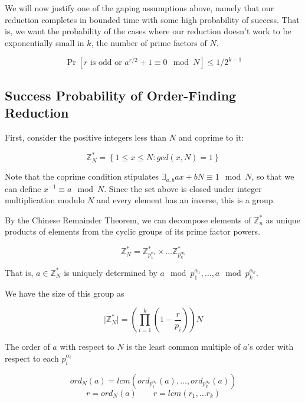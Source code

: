 \documentclass[12pt]{article}
\begin{document}
We will now justify one of the gaping assumptions above, namely that our
reduction completes in bounded time with some high probability of success.
That is, we want the probability of the cases where our reduction doesn't
work to be exponentially small in $k$, the number of prime factors of $N$.

\begin{displaymath}
\Pr\left[ r \text{ is odd or } a^{r/2} + 1 \equiv 0 \mod N \right] \le 1/2^{k-1}
\end{displaymath}

\subsection{Success Probability of Order-Finding Reduction}

First, consider the positive integers less than $N$ and coprime to
it:

\begin{displaymath}
\mathbb{Z}^*_N = \left\{ 1 \le x \le N : gcd(x,N) = 1 \right\}
\end{displaymath}

Note that the coprime condition stipulates
$\exists_{a,b} ax + bN \equiv 1 \mod N$, so that we can define
$x^{-1} \equiv a \mod N$.
Since the set above is closed under integer multiplication modulo $N$ and
every element has an inverse, this is a group.

By the Chinese Remainder Theorem, we can decompose elements of
$\mathbb{Z}^*_n$ as unique products of elements from the cyclic groups of
its prime factor powers.

\begin{displaymath}
\mathbb{Z}^*_N = \mathbb{Z}^*_{p_1^{\alpha_1}} \times \ldots
\mathbb{Z}^*_{p_k^{\alpha_k}}
\end{displaymath}

That is, $a \in \mathbb{Z}^*_N$ is uniquely determined by
$a \mod p_1^{\alpha_1}, \ldots , a \mod p_k^{\alpha_k}$.

We have the size of this group as

\begin{displaymath}
\mid \mathbb{Z}^*_N \mid = (\prod_{i=1}^k (1 - \frac{r}{p_i})) N
\end{displaymath}

The order of $a$
with respect to $N$ is the least common multiple of $a$'s order with
respect to each $p_i^{\alpha_i}$

\begin{displaymath}
ord_N(a) = lcm(ord_{p_1^{\alpha_1}}(a), \ldots , ord_{p_k^{\alpha_k}}(a))
\end{displaymath}
\begin{displaymath}
r = ord_N(a) \qquad r = lcm(r_1, \ldots r_k)
\end{displaymath}
\end{document}

